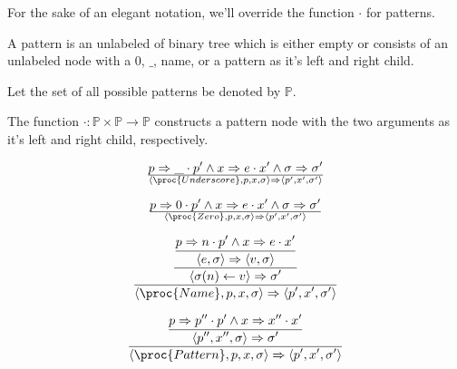 For the sake of an elegant notation, we'll override the function $\cdot$ for
patterns.

\begin{definition}

A pattern is an unlabeled of binary tree which is either empty or consists of
an unlabeled node with a $0$, $\_$, name, or a pattern as it's left and right
child. 

\end{definition}

\begin{definition}

Let the set of all possible patterns be denoted by $\mathbb{P}$.

\end{definition}

\begin{definition}

The function $\cdot
:\mathbb{P}\times\mathbb{P}\rightarrow\mathbb{P}$ constructs a pattern node with the
two arguments as it's left and right child, respectively. 

\end{definition}

\begin{equation}
{
    p\Rightarrow \_\cdot p'
  \wedge
    x\Rightarrow e\cdot x'
  \wedge
    \sigma\Rightarrow\sigma'
}\over{
  \left\langle\proc{Underscore}, p,x,\sigma\right\rangle
  \Rightarrow
  \left\langle p',x',\sigma'\right\rangle
}
\end{equation}

\begin{equation}
{
    p\Rightarrow 0\cdot p'
  \wedge
    x\Rightarrow e\cdot x'
  \wedge
    \sigma\Rightarrow\sigma'
}\over{
  \left\langle\proc{Zero}, p,x,\sigma\right\rangle
  \Rightarrow
  \left\langle p',x',\sigma'\right\rangle
}
\end{equation}


\begin{equation}
{\displaystyle
{\displaystyle
{\displaystyle
    p\Rightarrow n\cdot p'
  \wedge
    x\Rightarrow e\cdot x'
\over\displaystyle
    \left\langle e,\sigma\right\rangle
    \Rightarrow
    \left\langle v,\sigma\right\rangle
}\over\displaystyle
    \left\langle\sigma(n)\leftarrow v\right\rangle
    \Rightarrow
    \sigma'
}\over\displaystyle
  \left\langle\proc{Name}, p,x,\sigma\right\rangle
  \Rightarrow
  \left\langle p',x',\sigma'\right\rangle
}
\end{equation}

\begin{equation}
{\displaystyle
{\displaystyle
    p\Rightarrow p''\cdot p'  
  \wedge
    x\Rightarrow x''\cdot x'
\over\displaystyle
  \left\langle p'', x'', \sigma\right\rangle
  \Rightarrow
  \sigma'
}
\over\displaystyle
  \left\langle\proc{Pattern}, p,x,\sigma\right\rangle
  \Rightarrow
  \left\langle p',x',\sigma'\right\rangle
}
\end{equation}
